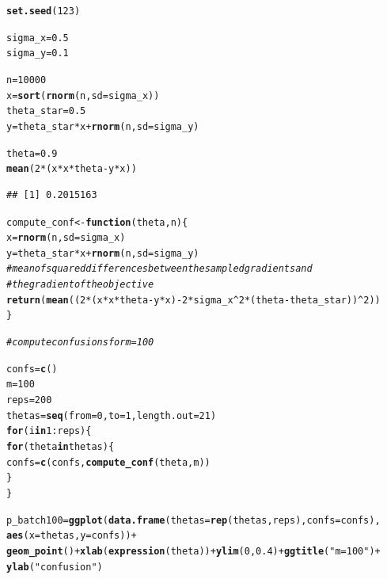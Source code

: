 \documentclass[a4paper]{article}
\makeatletter
\newcommand{\hlnum}[1]{\textcolor[rgb]{0.686,0.059,0.569}{#1}}%
\newcommand{\hlstr}[1]{\textcolor[rgb]{0.192,0.494,0.8}{#1}}%
\newcommand{\hlcom}[1]{\textcolor[rgb]{0.678,0.584,0.686}{\textit{#1}}}%
\newcommand{\hlopt}[1]{\textcolor[rgb]{0,0,0}{#1}}%
\newcommand{\hlstd}[1]{\textcolor[rgb]{0.345,0.345,0.345}{#1}}%
\newcommand{\hlkwa}[1]{\textcolor[rgb]{0.161,0.373,0.58}{\textbf{#1}}}%
\newcommand{\hlkwb}[1]{\textcolor[rgb]{0.69,0.353,0.396}{#1}}%
\newcommand{\hlkwc}[1]{\textcolor[rgb]{0.333,0.667,0.333}{#1}}%
\newcommand{\hlkwd}[1]{\textcolor[rgb]{0.737,0.353,0.396}{\textbf{#1}}}%
\newenvironment{kframe}{%
 \def\at@end@of@kframe{}%
 \ifinner\ifhmode%
  \def\at@end@of@kframe{\end{minipage}}%
  \begin{minipage}{\columnwidth}%
 \fi\fi%
 \def\FrameCommand##1{\hskip\@totalleftmargin \hskip-\fboxsep
 \colorbox{shadecolor}{##1}\hskip-\fboxsep
     \hskip-\linewidth \hskip-\@totalleftmargin \hskip\columnwidth}%
 \MakeFramed {\advance\hsize-\width
   \@totalleftmargin\z@ \linewidth\hsize
   \@setminipage}}%
 {\par\unskip\endMakeFramed%
 \at@end@of@kframe}
\newenvironment{knitrout}{}{} %
\makeatother
\begin{document}
{\begin{enumerate}
\begin{knitrout}
\begin{kframe}
\begin{alltt}
\hlkwd{set.seed}\hlstd{(}\hlnum{123}\hlstd{)}

\hlstd{sigma_x} \hlkwb{=} \hlnum{0.5}
\hlstd{sigma_y} \hlkwb{=} \hlnum{0.1}

\hlstd{n} \hlkwb{=} \hlnum{10000}
\hlstd{x} \hlkwb{=} \hlkwd{sort}\hlstd{(}\hlkwd{rnorm}\hlstd{(n,} \hlkwc{sd} \hlstd{= sigma_x))}
\hlstd{theta_star} \hlkwb{=} \hlnum{0.5}
\hlstd{y} \hlkwb{=} \hlstd{theta_star} \hlopt{*} \hlstd{x} \hlopt{+} \hlkwd{rnorm}\hlstd{(n,} \hlkwc{sd} \hlstd{= sigma_y)}

\hlstd{theta} \hlkwb{=} \hlnum{0.9}
\hlkwd{mean}\hlstd{(}\hlnum{2}\hlopt{*}\hlstd{(x}\hlopt{*}\hlstd{x}\hlopt{*}\hlstd{theta} \hlopt{-} \hlstd{y}\hlopt{*}\hlstd{x))}
\end{alltt}
\begin{verbatim}
## [1] 0.2015163
\end{verbatim}
\begin{alltt}
\hlstd{compute_conf} \hlkwb{<-} \hlkwa{function}\hlstd{(}\hlkwc{theta}\hlstd{,} \hlkwc{n}\hlstd{)\{}
  \hlstd{x} \hlkwb{=} \hlkwd{rnorm}\hlstd{(n,} \hlkwc{sd} \hlstd{= sigma_x)}
  \hlstd{y} \hlkwb{=} \hlstd{theta_star} \hlopt{*} \hlstd{x} \hlopt{+} \hlkwd{rnorm}\hlstd{(n,} \hlkwc{sd} \hlstd{= sigma_y)}
  \hlcom{# mean of squared differences between the sampled gradients and}
  \hlcom{# the gradient of the objective}
  \hlkwd{return}\hlstd{(}\hlkwd{mean}\hlstd{((}\hlnum{2}\hlopt{*}\hlstd{(x}\hlopt{*}\hlstd{x}\hlopt{*}\hlstd{theta} \hlopt{-} \hlstd{y}\hlopt{*}\hlstd{x)} \hlopt{-} \hlnum{2}\hlopt{*}\hlstd{sigma_x}\hlopt{^}\hlnum{2}\hlopt{*}\hlstd{(theta} \hlopt{-} \hlstd{theta_star))}\hlopt{^}\hlnum{2}\hlstd{))}
\hlstd{\}}

\hlcom{# compute confusions for m = 100}

\hlstd{confs} \hlkwb{=} \hlkwd{c}\hlstd{()}
\hlstd{m} \hlkwb{=} \hlnum{100}
\hlstd{reps} \hlkwb{=} \hlnum{200}
\hlstd{thetas} \hlkwb{=} \hlkwd{seq}\hlstd{(}\hlkwc{from}\hlstd{=}\hlnum{0}\hlstd{,} \hlkwc{to}\hlstd{=}\hlnum{1}\hlstd{,} \hlkwc{length.out} \hlstd{=} \hlnum{21}\hlstd{)}
\hlkwa{for}\hlstd{(i} \hlkwa{in} \hlnum{1}\hlopt{:}\hlstd{reps)\{}
  \hlkwa{for}\hlstd{(theta} \hlkwa{in} \hlstd{thetas)\{}
    \hlstd{confs} \hlkwb{=} \hlkwd{c}\hlstd{(confs,} \hlkwd{compute_conf}\hlstd{(theta, m))}
  \hlstd{\}}
\hlstd{\}}

\hlstd{p_batch100} \hlkwb{=} \hlkwd{ggplot}\hlstd{(}\hlkwd{data.frame}\hlstd{(}\hlkwc{thetas} \hlstd{=} \hlkwd{rep}\hlstd{(thetas, reps),} \hlkwc{confs} \hlstd{= confs),}
                    \hlkwd{aes}\hlstd{(}\hlkwc{x} \hlstd{= thetas,} \hlkwc{y} \hlstd{= confs))} \hlopt{+}
  \hlkwd{geom_point}\hlstd{()} \hlopt{+} \hlkwd{xlab}\hlstd{(}\hlkwd{expression}\hlstd{(theta))} \hlopt{+} \hlkwd{ylim}\hlstd{(}\hlnum{0}\hlstd{,} \hlnum{0.4}\hlstd{)} \hlopt{+} \hlkwd{ggtitle}\hlstd{(}\hlstr{"m = 100"}\hlstd{)} \hlopt{+}
  \hlkwd{ylab}\hlstd{(}\hlstr{"confusion"}\hlstd{)}


\end{alltt}
\end{kframe}
\end{knitrout}
\end{enumerate}}
\end{document}
